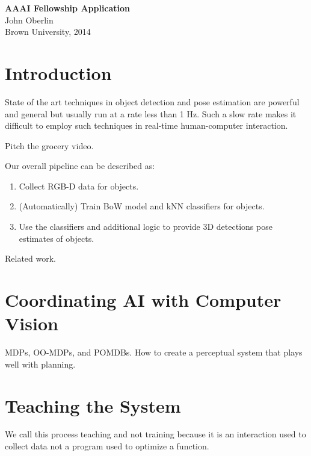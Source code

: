 \documentclass[12pt]{article}
\numberwithin{equation}{section}
\numberwithin{table}{section}
\numberwithin{figure}{section}
\begin{document}



\begin{center}
\textbf{\Large AAAI Fellowship Application}\\[12pt] 
John Oberlin\\
Brown University, 2014\\
\end{center}

\section{Introduction}

State of the art techniques in object detection and pose estimation
are powerful and general but usually run at a rate less than 1 Hz. Such a slow
rate makes it difficult to employ such techniques in real-time human-computer interaction.

Pitch the grocery video.

Our overall pipeline can be described as:

\begin{enumerate}
  \item Collect RGB-D data for objects.
  \item (Automatically) Train BoW model and kNN classifiers for objects.
  \item Use the classifiers and additional logic to provide 3D detections pose estimates of objects.
\end{enumerate}

Related work.

\section{Coordinating AI with Computer Vision}
MDPs, OO-MDPs, and POMDBs. How to create a perceptual system that plays well with planning.


\section{Teaching the System}
We call this process teaching and not training because it is an interaction used to collect
data not a program used to optimize a function.
\end{document}
